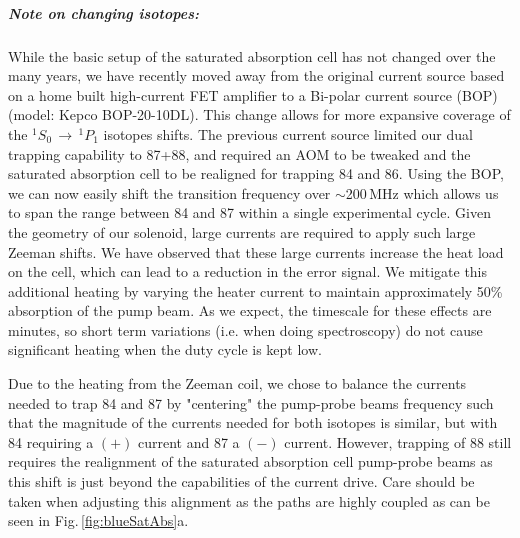 \subparagraph{Note on changing isotopes:} \label{para:change_iso}
While the basic setup of the saturated absorption cell has not changed over the many years, we have recently moved away from the original current source based on a home built high-current FET amplifier to a Bi-polar current source (BOP) (model: Kepco BOP-20-10DL).
This change allows for more expansive coverage of the $^1S_0\,\rightarrow\,^1P_1$ isotopes shifts. The previous current source limited our dual trapping capability to 87+88, and required an AOM to be tweaked and the saturated absorption cell to be realigned for trapping 84 and 86. 
Using the BOP, we can now easily shift the transition frequency over $\sim$200\,MHz which allows us to span the range between 84 and 87 within a single experimental cycle.
Given the geometry of our solenoid, large currents are required to apply such large Zeeman shifts.
We have observed that these large currents increase the heat load on the cell, which can lead to a reduction in the error signal.
We mitigate this additional heating by varying the heater current to maintain approximately 50\% absorption of the pump beam.
As we expect, the timescale for these effects are minutes, so short term variations (i.e. when doing spectroscopy) do not cause significant heating when the duty cycle is kept low.

Due to the heating from the Zeeman coil, we chose to balance the currents needed to trap 84 and 87 by "centering" the pump-probe beams frequency such that the magnitude of the currents needed for both isotopes is similar, but with 84 requiring a $(+)$ current and 87 a $(-)$ current.
However, trapping of 88 still requires the realignment of the saturated absorption cell pump-probe beams as this shift is just beyond the capabilities of the current drive. 
Care should be taken when adjusting this alignment as the paths are highly coupled as can be seen in Fig.\,\ref{fig:blueSatAbs}a.

%
%
%
%	
%		

